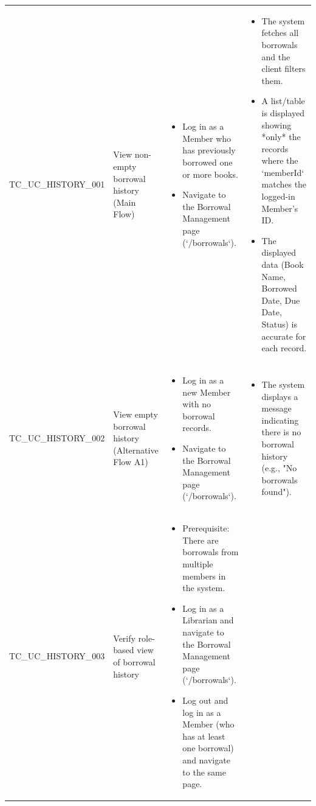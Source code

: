 \documentclass[10pt, a4paper]{report}
\begin{document}
\begin{longtable}{|>{\raggedright\arraybackslash}p{3.5cm}|>{\raggedright\arraybackslash}p{4cm}|>{\raggedright\arraybackslash}p{4cm}|>{\raggedright\arraybackslash}p{5cm}|}
\multicolumn{4}{|l|}{\textbf{Sub-Section: UC-005: View Borrowal History (Member) }} \\ \hline
TC\_UC\_HISTORY\_001 & View non-empty borrowal history (Main Flow) & 
    \begin{itemize}[noitemsep, topsep=0pt, partopsep=0pt, leftmargin=*]
        \item Log in as a Member who has previously borrowed one or more books.
        \item Navigate to the Borrowal Management page (`/borrowals`).
    \end{itemize} & 
    \begin{itemize}[noitemsep, topsep=0pt, partopsep=0pt, leftmargin=*]
        \item The system fetches all borrowals and the client filters them.
        \item A list/table is displayed showing *only* the records where the `memberId` matches the logged-in Member's ID.
        \item The displayed data (Book Name, Borrowed Date, Due Date, Status) is accurate for each record.
    \end{itemize} \\ \hline
TC\_UC\_HISTORY\_002 & View empty borrowal history (Alternative Flow A1) & 
    \begin{itemize}[noitemsep, topsep=0pt, partopsep=0pt, leftmargin=*]
        \item Log in as a new Member with no borrowal records.
        \item Navigate to the Borrowal Management page (`/borrowals`).
    \end{itemize} & 
    \begin{itemize}[noitemsep, topsep=0pt, partopsep=0pt, leftmargin=*]
        \item The system displays a message indicating there is no borrowal history (e.g., "No borrowals found").
    \end{itemize} \\ \hline
TC\_UC\_HISTORY\_003 & Verify role-based view of borrowal history & 
    \begin{itemize}[noitemsep, topsep=0pt, partopsep=0pt, leftmargin=*]
        \item Prerequisite: There are borrowals from multiple members in the system.
        \item Log in as a Librarian and navigate to the Borrowal Management page (`/borrowals`).
        \item Log out and log in as a Member (who has at least one borrowal) and navigate to the same page.

\end{itemize}
\end{longtable}
\end{document}
